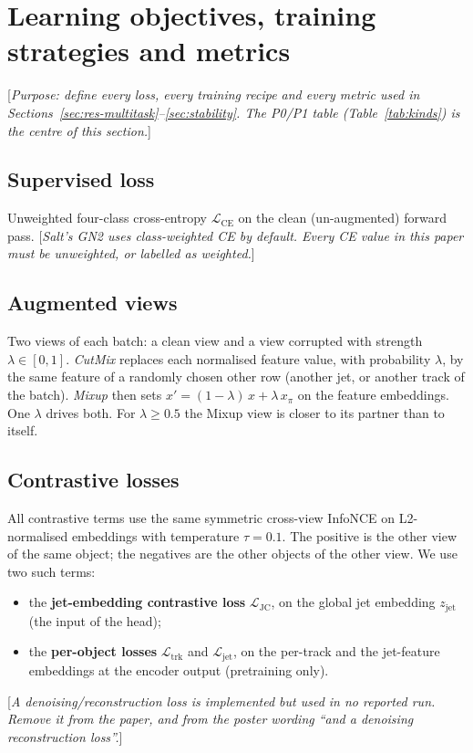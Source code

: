 \documentclass[11pt,a4paper]{article}
\newcommand{\note}[1]{\textcolor{blue!70!black}{[\emph{#1}]}}
\newcommand{\LCE}{\mathcal{L}_{\mathrm{CE}}}
\newcommand{\LJC}{\mathcal{L}_{\mathrm{JC}}}
\newcommand{\Ltrk}{\mathcal{L}_{\mathrm{trk}}}
\newcommand{\Ljet}{\mathcal{L}_{\mathrm{jet}}}
\begin{document}
\section{Learning objectives, training strategies and metrics}
\label{sec:methods}

\note{Purpose: define every loss, every training recipe and every metric used in
Sections~\ref{sec:res-multitask}--\ref{sec:stability}. The P0/P1 table
(Table~\ref{tab:kinds}) is the centre of this section.}

\subsection{Supervised loss}
Unweighted four-class cross-entropy $\LCE$ on the clean (un-augmented) forward pass.
\note{Salt's GN2 uses class-weighted CE by default. Every CE value in this paper must be
unweighted, or labelled as weighted.}

\subsection{Augmented views}
Two views of each batch: a clean view and a view corrupted with strength
$\lambda\in[0,1]$. \emph{CutMix} replaces each normalised feature value, with probability
$\lambda$, by the same feature of a randomly chosen other row (another jet, or another
track of the batch). \emph{Mixup} then sets $x'=(1-\lambda)\,x+\lambda\,x_{\pi}$ on the
feature embeddings. One $\lambda$ drives both. For $\lambda\ge0.5$ the Mixup view is closer
to its partner than to itself.

\subsection{Contrastive losses}
All contrastive terms use the same symmetric cross-view InfoNCE on L2-normalised embeddings
with temperature $\tau=0.1$. The positive is the other view of the same object; the
negatives are the other objects of the other view. We use two such terms:
\begin{itemize}
  \item the \textbf{jet-embedding contrastive loss} $\LJC$, on the global jet embedding
        $z_{\mathrm{jet}}$ (the input of the head);
  \item the \textbf{per-object losses} $\Ltrk$ and $\Ljet$, on the per-track and the
        jet-feature embeddings at the encoder output (pretraining only).
\end{itemize}
\note{A denoising/reconstruction loss is implemented but used in no reported run. Remove it
from the paper, and from the poster wording ``and a denoising reconstruction loss''.}
\end{document}
